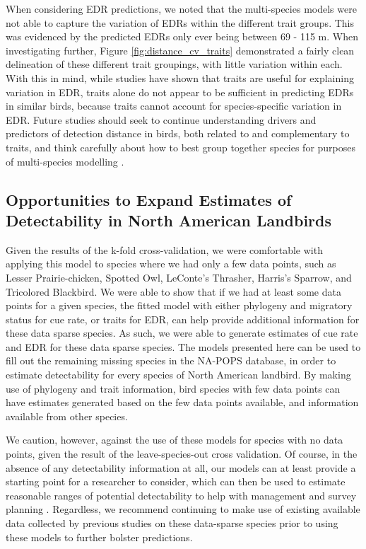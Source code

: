 \documentclass[12pt]{article}
\begin{document}
\par When considering EDR predictions, we noted that the multi-species models were not able to capture the variation of EDRs within the different trait groups.
This was evidenced by the predicted EDRs only ever being between 69 - 115 m.
When investigating further, Figure \ref{fig:distance_cv_traits} demonstrated a fairly clean delineation of these different trait groupings, with little variation within each.
With this in mind, while studies have shown that traits are useful for explaining variation in EDR, traits alone do not appear to be sufficient in predicting EDRs in similar birds, because traits cannot account for species-specific variation in EDR. 
Future studies should seek to continue understanding drivers and predictors of detection distance in birds, both related to and complementary to traits, and think carefully about how to best group together species for purposes of multi-species modelling \citep{pacifici_guidelines_2014}.

\subsection{Opportunities to Expand Estimates of Detectability in North American Landbirds}

\par Given the results of the k-fold cross-validation, we were comfortable with applying this model to species where we had only a few data points, such as Lesser Prairie-chicken, Spotted Owl, LeConte's Thrasher, Harris's Sparrow, and Tricolored Blackbird.
We were able to show that if we had at least some data points for a given species, the fitted model with either phylogeny and migratory status for cue rate, or traits for EDR, can help provide additional information for these data sparse species.
As such, we were able to generate estimates of cue rate and EDR for these data sparse species.
The models presented here can be used to fill out the remaining missing species in the NA-POPS database, in order to estimate detectability for every species of North American landbird. 
By making use of phylogeny and trait information, bird species with few data points can have estimates generated based on the few data points available, and information available from other species.

\par We caution, however, against the use of these models for species with no data points, given the result of the leave-species-out cross validation.
Of course, in the absence of any detectability information at all, our models can at least provide a starting point for a researcher to consider, which can then be used to estimate reasonable ranges of potential detectability to help with management and survey planning \citep{bennett_how_2024}.
Regardless, we recommend continuing to make use of existing available data collected by previous studies on these data-sparse species prior to using these models to further bolster predictions.
\end{document}
